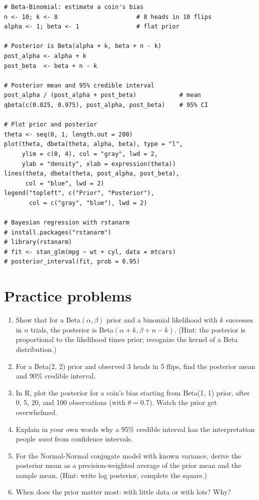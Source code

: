 \begin{codelab}
\begin{lstlisting}[language=Rlang]
# Beta-Binomial: estimate a coin's bias
n <- 10; k <- 8                      # 8 heads in 10 flips
alpha <- 1; beta <- 1                # flat prior

# Posterior is Beta(alpha + k, beta + n - k)
post_alpha <- alpha + k
post_beta  <- beta + n - k

# Posterior mean and 95% credible interval
post_alpha / (post_alpha + post_beta)            # mean
qbeta(c(0.025, 0.975), post_alpha, post_beta)    # 95% CI

# Plot prior and posterior
theta <- seq(0, 1, length.out = 200)
plot(theta, dbeta(theta, alpha, beta), type = "l",
     ylim = c(0, 4), col = "gray", lwd = 2,
     ylab = "density", xlab = expression(theta))
lines(theta, dbeta(theta, post_alpha, post_beta),
      col = "blue", lwd = 2)
legend("topleft", c("Prior", "Posterior"),
       col = c("gray", "blue"), lwd = 2)

# Bayesian regression with rstanarm
# install.packages("rstanarm")
# library(rstanarm)
# fit <- stan_glm(mpg ~ wt + cyl, data = mtcars)
# posterior_interval(fit, prob = 0.95)
\end{lstlisting}
\end{codelab}

\section{Practice problems}

\begin{enumerate}
  \item Show that for a Beta$(\alpha, \beta)$ prior and a binomial likelihood with $k$ successes in $n$ trials, the posterior is Beta$(\alpha + k, \beta + n - k)$. (Hint: the posterior is proportional to the likelihood times prior; recognize the kernel of a Beta distribution.)
  \item For a Beta(2, 2) prior and observed 3 heads in 5 flips, find the posterior mean and 90\% credible interval.
  \item In R, plot the posterior for a coin's bias starting from Beta(1, 1) prior, after 0, 5, 20, and 100 observations (with $\theta = 0.7$). Watch the prior get overwhelmed.
  \item Explain in your own words why a 95\% credible interval has the interpretation people \emph{want} from confidence intervals.
  \item For the Normal-Normal conjugate model with known variance, derive the posterior mean as a precision-weighted average of the prior mean and the sample mean. (Hint: write log posterior, complete the square.)
  \item When does the prior matter most: with little data or with lots? Why?
\end{enumerate}

